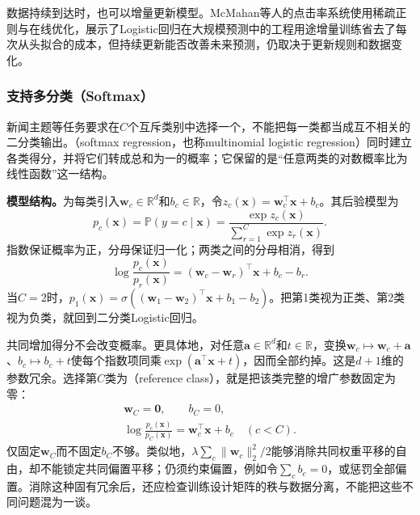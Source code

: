数据持续到达时，也可以增量更新模型。McMahan等人的点击率系统使用稀疏正则与在线优化，展示了Logistic回归在大规模预测中的工程用途增量训练省去了每次从头拟合的成本，但持续更新能否改善未来预测，仍取决于更新规则和数据变化。

\subsubsection{支持多分类（Softmax）}
\label{sec:classification-logistic-softmax}

新闻主题等任务要求在$C$个互斥类别中选择一个，不能把每一类都当成互不相关的二分类输出。（softmax regression，也称multinomial logistic regression）同时建立各类得分，并将它们转成总和为一的概率；它保留的是“任意两类的对数概率比为线性函数”这一结构。

\textbf{模型结构。}为每类引入$\bm{w}_c\in\mathbb{R}^{d}$和$b_c\in\mathbb{R}$，令$z_c(\bm{x})=\bm{w}_c^{\top}\bm{x}+b_c$。其后验模型为
\begin{equation}
  \label{eq:classification-softmax-model}
  p_c(\bm{x})
  =\mathbb{P}(y=c\mid\bm{x})
  =\frac{\exp z_c(\bm{x})}
         {\sum_{r=1}^{C}\exp z_r(\bm{x})}.
\end{equation}
指数保证概率为正，分母保证归一化；两类之间的分母相消，得到
\[
  \log\frac{p_c(\bm{x})}{p_r(\bm{x})}
  =(\bm{w}_c-\bm{w}_r)^{\top}\bm{x}+b_c-b_r.
\]
当$C=2$时，$p_1(\bm{x})=\sigma((\bm{w}_1-\bm{w}_2)^{\top}\bm{x}+b_1-b_2)$。把第1类视为正类、第2类视为负类，就回到二分类Logistic回归。

共同增加得分不会改变概率。更具体地，对任意$\bm{a}\in\mathbb{R}^{d}$和$t\in\mathbb{R}$，变换$\bm{w}_c\mapsto\bm{w}_c+\bm{a}$、$b_c\mapsto b_c+t$使每个指数项同乘$\exp(\bm{a}^{\top}\bm{x}+t)$，因而全部约掉。这是$d+1$维的参数冗余。选择第$C$类为（reference class），就是把该类完整的增广参数固定为零：
\begin{equation}
  \label{eq:classification-softmax-reference}
  \begin{gathered}
    \bm{w}_C=\bm{0},\qquad b_C=0,\\
    \log\frac{p_c(\bm{x})}{p_C(\bm{x})}
    =\bm{w}_c^{\top}\bm{x}+b_c
    \quad(c<C).
  \end{gathered}
\end{equation}
仅固定$\bm{w}_C$而不固定$b_C$不够。类似地，$\lambda\sum_c\lVert\bm{w}_c\rVert_2^2/2$能够消除共同权重平移的自由，却不能锁定共同偏置平移；仍须约束偏置，例如令$\sum_c b_c=0$，或惩罚全部偏置。消除这种固有冗余后，还应检查训练设计矩阵的秩与数据分离，不能把这些不同问题混为一谈。

